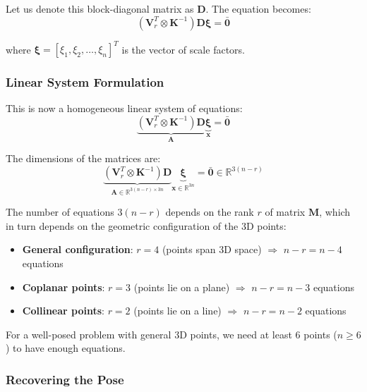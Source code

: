 \documentclass[11pt,a4paper]{article}
\theoremstyle{definition}
\theoremstyle{plain}
\theoremstyle{remark}
\begin{document}
Let us denote this block-diagonal matrix as $\mathbf{D}$. The equation becomes:
\begin{equation} \nonumber
(\mathbf{V}_r^T \otimes \mathbf{K}^{-1}) \mathbf{D} \boldsymbol{\xi} = \bar{\mathbf{0}}
\end{equation}

where $\boldsymbol{\xi} = [\xi_1, \xi_2, \ldots, \xi_n]^T$ is the vector of scale factors.

\subsubsection{Linear System Formulation}

This is now a homogeneous linear system of equations:
\begin{equation} \nonumber
\underbrace{(\mathbf{V}_r^T \otimes \mathbf{K}^{-1}) \mathbf{D}}_{\mathbf{A}} \underbrace{\boldsymbol{\xi}}_{\mathbf{x}} = \bar{\mathbf{0}}
\end{equation}

The dimensions of the matrices are:
\begin{equation} \nonumber
\underbrace{(\mathbf{V}_r^T \otimes \mathbf{K}^{-1}) \mathbf{D}}_{\mathbf{A} \in \mathbb{R}^{3(n-r) \times 3n}} \underbrace{\boldsymbol{\xi}}_{\mathbf{x} \in \mathbb{R}^{3n}} = \bar{\mathbf{0}} \in \mathbb{R}^{3(n-r)}
\end{equation}

\begin{tcolorbox}[colback=cyan!5!white,colframe=cyan!75!black,title=\textbf{Degeneracy Cases}]
The number of equations $3(n-r)$ depends on the rank $r$ of matrix $\mathbf{M}$, which in turn depends on the geometric configuration of the 3D points:
\begin{itemize}
    \item \textbf{General configuration}: $r = 4$ (points span 3D space) $\Rightarrow$ $n-r = n-4$ equations
    \item \textbf{Coplanar points}: $r = 3$ (points lie on a plane) $\Rightarrow$ $n-r = n-3$ equations
    \item \textbf{Collinear points}: $r = 2$ (points lie on a line) $\Rightarrow$ $n-r = n-2$ equations
\end{itemize}
For a well-posed problem with general 3D points, we need at least 6 points ($n \geq 6$) to have enough equations.
\end{tcolorbox}

\subsubsection{Recovering the Pose}
\end{document}
